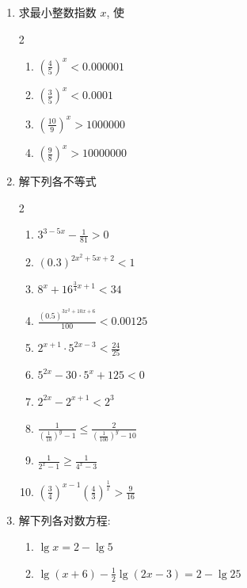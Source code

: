 \begin{enumerate}
\item  求最小整数指数 $x$, 使
\begin{multicols}{2}
  \begin{enumerate}
    \item  $\left(\frac{4}{5}\right)^{x}<0.000001$
  \item  $\left(\frac{3}{5}\right)^{x}<0.0001$
    \item $\left(\frac{10}{9}\right)^{x}>1000000$
    \item $\left(\frac{9}{8}\right)^{x}>10000000$
  \end{enumerate}
\end{multicols}

\item  解下列各不等式
\begin{multicols}{2}
\begin{enumerate}
 \item  $3^{3-5 x}-\frac{1}{81}>0$
\item  $(0.3)^{2 x^{2}+5 x+2}<1$
\item  $8^{x}+16^{\tfrac{3}{4} x+1}<34$
\item  $\frac{(0.5)^{3 x^{2}+10 x+6}}{100}<0.00125$
\item  $2^{x+1} \cdot 5^{2 x-3}<\frac{24}{25}$
\item  $5^{2x}-30\cdot 5^{x}+125<0$
\item  $2^{2 x}-2^{x+1}<2^{3} $
\item  $\frac{1}{\left(\frac{1}{10}\right)^{y}-1} \leqslant \frac{2}{\left(\frac{1}{100}\right)^{y}-10}$
\item  $\frac{1}{2^{x}-1} \geqslant \frac{1}{4^{x}-3}$
\item  $\left(\frac{3}{4}\right)^{x-1}\left(\frac{4}{3}\right)^{\tfrac{1}{x}}>\frac{9}{16}$
\end{enumerate}
\end{multicols}


\item  解下列各对数方程:

  \begin{enumerate}
   \item  $\lg x=2-\lg 5$
   \item $\lg(x+6)-\frac{1}{2}\lg(2x-3)=2-\lg 25$
  \end{enumerate}



\end{enumerate}
